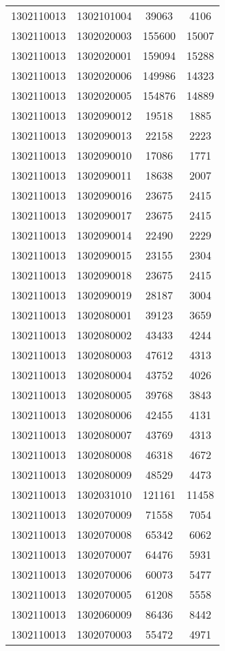\begin{longtable}{llcc}
1302110013 & 1302101004 & 39063 & 4106\\
1302110013 & 1302020003 & 155600 & 15007\\
1302110013 & 1302020001 & 159094 & 15288\\
1302110013 & 1302020006 & 149986 & 14323\\
1302110013 & 1302020005 & 154876 & 14889\\
1302110013 & 1302090012 & 19518 & 1885\\
1302110013 & 1302090013 & 22158 & 2223\\
1302110013 & 1302090010 & 17086 & 1771\\
1302110013 & 1302090011 & 18638 & 2007\\
1302110013 & 1302090016 & 23675 & 2415\\
1302110013 & 1302090017 & 23675 & 2415\\
1302110013 & 1302090014 & 22490 & 2229\\
1302110013 & 1302090015 & 23155 & 2304\\
1302110013 & 1302090018 & 23675 & 2415\\
1302110013 & 1302090019 & 28187 & 3004\\
1302110013 & 1302080001 & 39123 & 3659\\
1302110013 & 1302080002 & 43433 & 4244\\
1302110013 & 1302080003 & 47612 & 4313\\
1302110013 & 1302080004 & 43752 & 4026\\
1302110013 & 1302080005 & 39768 & 3843\\
1302110013 & 1302080006 & 42455 & 4131\\
1302110013 & 1302080007 & 43769 & 4313\\
1302110013 & 1302080008 & 46318 & 4672\\
1302110013 & 1302080009 & 48529 & 4473\\
1302110013 & 1302031010 & 121161 & 11458\\
1302110013 & 1302070009 & 71558 & 7054\\
1302110013 & 1302070008 & 65342 & 6062\\
1302110013 & 1302070007 & 64476 & 5931\\
1302110013 & 1302070006 & 60073 & 5477\\
1302110013 & 1302070005 & 61208 & 5558\\
1302110013 & 1302060009 & 86436 & 8442\\
1302110013 & 1302070003 & 55472 & 4971\\

\end{longtable}
